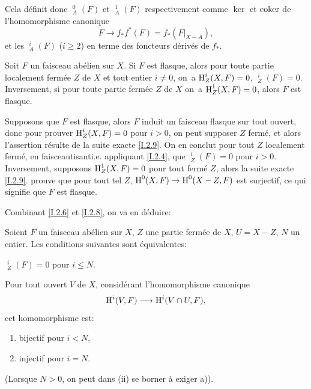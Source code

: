 Cela d\'efinit donc $\mathop{\underline{\mathrm{H}}}\nolimits^0_A(F)$ et $\mathop{\underline{\mathrm{H}}}\nolimits_A^1(F)$ respectivement comme $\ker$ et $\operatorname{coker}$ de l'homomorphisme canonique
$$F \to f_*f^*(F)= f_*(F|_{X-A}),
$$
et les $\mathop{\underline{\mathrm{H}}}\nolimits_A^i(F)$ ($i\geq 2$) en terme des foncteurs d\'eriv\'es de $f_*$.

\begin{corollaire} \label{I.2.12}
Soit $F$ un faisceau ab\'elien sur $X$. Si $F$ est flasque, alors pour toute partie localement ferm\'ee $Z$ de $X$ et tout entier $i\neq 0$, on~a $\operatorname{H}^i_Z(X, F)=0$, $\mathop{\underline{\mathrm{H}}}\nolimits^i_Z(F)=0$. Inversement, si pour toute partie ferm\'ee $Z$ de $X$ on~a $\operatorname{H}_Z^1(X, F)=0$, alors $F$ est flasque.
\end{corollaire}

Supposons que $F$ est flasque, alors $F$ induit un faisceau flasque sur tout ouvert, donc pour prouver $\operatorname{H}^i_Z(X, F)=0$ pour $i>0$, on peut supposer $Z$ ferm\'e, et alors l'assertion r\'esulte de la suite exacte \ref{I.2.9}. On en conclut pour tout $Z$ localement ferm\'e, en \og faisceautisant\fg i.e. appliquant \ref{I.2.4}, que $\mathop{\underline{\mathrm{H}}}\nolimits^i_Z(F)=0$ pour $i>0$. Inversement, supposons $\operatorname{H}^1_Z(X, F)=0$ pour tout ferm\'e $Z$, alors la suite exacte \ref{I.2.9}. prouve que pour tout tel $Z$, $\H^0(X, F) \to \H^0(X-Z, F)$ est surjectif, ce qui signifie que $F$ est flasque.

Combinant \ref{I.2.6} et \ref{I.2.8}, on va en d\'eduire:

\begin{proposition} \label{I.2.13}
Soient $F$ un faisceau ab\'elien sur $X$, $Z$ une partie ferm\'ee de $X$, $U=X-Z$, $N$ un entier. Les conditions suivantes sont \'equivalentes:
\begin{enumeratei}
\item
$\mathop{\underline{\mathrm{H}}}\nolimits^i_Z(F)=0$ pour $i\leq N$.
\item
Pour tout ouvert $V$ de $X$, consid\'erant l'homomorphisme canonique
$$
\H^i(V, F) \to \H^i(V\cap U, F),$$
cet homomorphisme est:
\begin{enumerate}
\item[\textup{a)}] bijectif pour $i<N$,
\item[\textup{b)}] injectif pour $i=N$.
\end{enumerate}
\end{enumeratei}
\noindent
(Lorsque $N>0$, on peut dans \textup{(ii)} se borner \`a exiger \textup{a)}).
\end{proposition}

